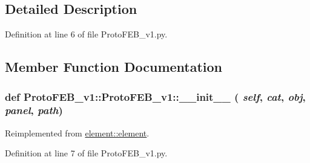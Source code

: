\subsection{Detailed Description}


Definition at line 6 of file ProtoFEB\_\-v1.py.

\subsection{Member Function Documentation}
\hypertarget{classProtoFEB__v1_1_1ProtoFEB__v1_a4fe76cce14ea6f67a0b32d45a92ab577}{
\subsubsection[{\_\-\_\-init\_\-\_\-}]{\setlength{\rightskip}{0pt plus 5cm}def ProtoFEB\_\-v1::ProtoFEB\_\-v1::\_\-\_\-init\_\-\_\- ( {\em self}, \/   {\em cat}, \/   {\em obj}, \/   {\em panel}, \/   {\em path})}}
\label{classProtoFEB__v1_1_1ProtoFEB__v1_a4fe76cce14ea6f67a0b32d45a92ab577}


Reimplemented from \hyperlink{classelement_1_1element_a7c08cd9a50e415b05efacce60b4511d2}{element::element}.

Definition at line 7 of file ProtoFEB\_\-v1.py.


